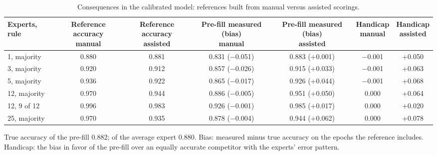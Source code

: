 \begin{table}[tbp]
\centering
\footnotesize
\caption{Consequences in the calibrated model: references built from manual versus assisted scorings.}
\label{tab:consequences}
\begin{adjustbox}{max width=\linewidth}
\begin{tabular}{lcccccc}
\toprule
Experts, rule & \makecell{Reference accuracy\\manual} & \makecell{Reference accuracy\\assisted} & \makecell{Pre-fill measured (bias)\\manual} & \makecell{Pre-fill measured (bias)\\assisted} & \makecell{Handicap\\manual} & \makecell{Handicap\\assisted} \\
\midrule
1, majority & 0.880 & 0.881 & 0.831 (\ensuremath{-}0.051) & 0.883 (+0.001) & \ensuremath{-}0.001 & +0.050 \\
3, majority & 0.920 & 0.912 & 0.857 (\ensuremath{-}0.026) & 0.915 (+0.033) & \ensuremath{-}0.001 & +0.063 \\
5, majority & 0.936 & 0.922 & 0.865 (\ensuremath{-}0.017) & 0.926 (+0.044) & \ensuremath{-}0.001 & +0.068 \\
12, majority & 0.970 & 0.944 & 0.886 (\ensuremath{-}0.005) & 0.951 (+0.050) & 0.000 & +0.064 \\
12, 9 of 12 & 0.996 & 0.983 & 0.926 (\ensuremath{-}0.001) & 0.985 (+0.017) & 0.000 & +0.020 \\
25, majority & 0.970 & 0.935 & 0.878 (\ensuremath{-}0.004) & 0.944 (+0.062) & 0.000 & +0.078 \\
\bottomrule
\end{tabular}
\end{adjustbox}
\par\smallskip
\begin{minipage}{0.95\linewidth}\footnotesize True accuracy of the pre-fill 0.882; of the average expert 0.880. Bias: measured minus true accuracy on the epochs the reference includes. Handicap: the bias in favor of the pre-fill over an equally accurate competitor with the experts' error pattern.\end{minipage}
\end{table}
